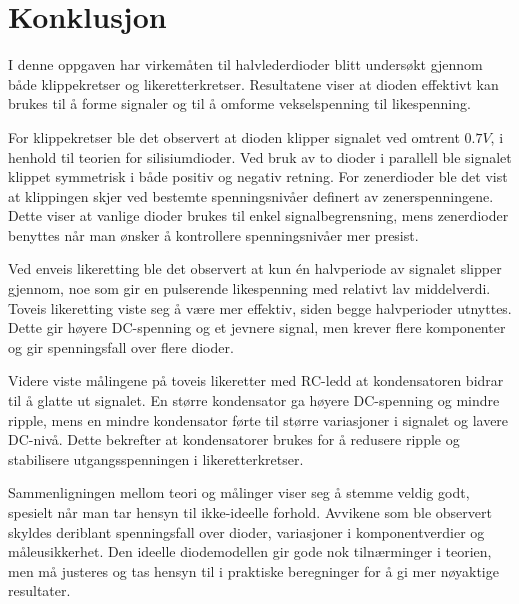 \section{Konklusjon}
    I denne oppgaven har virkemåten til halvlederdioder blitt undersøkt gjennom både klippekretser og likeretterkretser. Resultatene viser at dioden effektivt kan brukes til å forme signaler og til å omforme vekselspenning til likespenning.

    For klippekretser ble det observert at dioden klipper signalet ved omtrent $0.7V$, i henhold til teorien for silisiumdioder. Ved bruk av to dioder i parallell ble signalet klippet symmetrisk i både positiv og negativ retning. For zenerdioder ble det vist at klippingen skjer ved bestemte spenningsnivåer definert av zenerspenningene. Dette viser at vanlige dioder brukes til enkel signalbegrensning, mens zenerdioder benyttes når man ønsker å kontrollere spenningsnivåer mer presist.

    Ved enveis likeretting ble det observert at kun én halvperiode av signalet slipper gjennom, noe som gir en pulserende likespenning med relativt lav middelverdi. Toveis likeretting viste seg å være mer effektiv, siden begge halvperioder utnyttes. Dette gir høyere DC-spenning og et jevnere signal, men krever flere komponenter og gir spenningsfall over flere dioder.

    Videre viste målingene på toveis likeretter med RC-ledd at kondensatoren bidrar til å glatte ut signalet. En større kondensator ga høyere DC-spenning og mindre ripple, mens en mindre kondensator førte til større variasjoner i signalet og lavere DC-nivå. Dette bekrefter at kondensatorer brukes for å redusere ripple og stabilisere utgangsspenningen i likeretterkretser.

    Sammenligningen mellom teori og målinger viser seg å stemme veldig godt, spesielt når man tar hensyn til ikke-ideelle forhold. Avvikene som ble observert skyldes deriblant spenningsfall over dioder, variasjoner i komponentverdier og måleusikkerhet. Den ideelle diodemodellen gir gode nok tilnærminger i teorien, men må justeres og tas hensyn til i praktiske beregninger for å gi mer nøyaktige resultater.